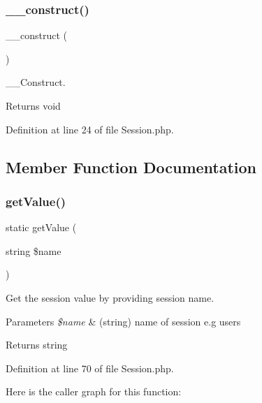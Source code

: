 \subsubsection{\texorpdfstring{\+\_\+\+\_\+construct()}{\_\_construct()}}
{\footnotesize\ttfamily \+\_\+\+\_\+construct (\begin{DoxyParamCaption}{ }\end{DoxyParamCaption})}

\+\_\+\+\_\+\+Construct.

\begin{DoxyReturn}{Returns}
void 
\end{DoxyReturn}


Definition at line 24 of file Session.\+php.



\subsection{Member Function Documentation}
\mbox{\label{class_zest_1_1_session_1_1_session_acba3a14ff7bb42eedd40d5e8a8f846c2}} 
\subsubsection{\texorpdfstring{get\+Value()}{getValue()}}
{\footnotesize\ttfamily static get\+Value (\begin{DoxyParamCaption}\item[{string}]{\$name }\end{DoxyParamCaption})\hspace{0.3cm}{\ttfamily [static]}}

Get the session value by providing session name.


\begin{DoxyParams}{Parameters}
{\em \$name} & (string) name of session e.\+g users\\
\hline
\end{DoxyParams}
\begin{DoxyReturn}{Returns}
string 
\end{DoxyReturn}


Definition at line 70 of file Session.\+php.

Here is the caller graph for this function\+:
\mbox{\label{class_zest_1_1_session_1_1_session_a93da4b5810cd219a403be01d51eaf8ec}} 
